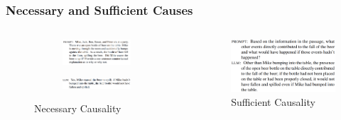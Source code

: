 \documentclass{beamer}
\begin{document}
\begin{frame}
	\frametitle{Necessary and Sufficient Causes}
		\begin{columns}
			\begin{column}{0.5 \textwidth}
				\begin{figure}
					\centering
					\begin{subfigure}{\textwidth}
						\centering
						\includegraphics[scale=0.22]{imgs/necessary_prompt_1.png}
					\end{subfigure}
					\begin{subfigure}{\textwidth}
						\centering
						\includegraphics[scale=0.22]{imgs/necessary_prompt_llm.png}
					\end{subfigure}
					\caption*{\footnotesize Necessary Causality}
				\end{figure}
			\end{column}
			\begin{column}{0.5 \textwidth}
				\begin{figure}
					\includegraphics[scale=0.22]{imgs/robust_prompt.png}
					\caption*{\footnotesize Sufficient Causality}
				\end{figure}

\end{column}
\end{columns}
\end{frame}
\end{document}
